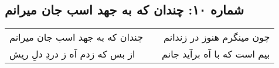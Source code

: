 \begin{center}
\section*{شماره ۱۰: چندان که به جهد اسب جان میرانم}
\label{sec:010}
\begin{longtable}{l p{0.5cm} r}
چندان که به جهد اسب جان میرانم
&&
چون مینگرم هنوز در زندانم
\\
از بس که زدم آه ز دردِ دلِ ریش
&&
بیم است که با آه برآید جانم
\\
\end{longtable}
\end{center}
